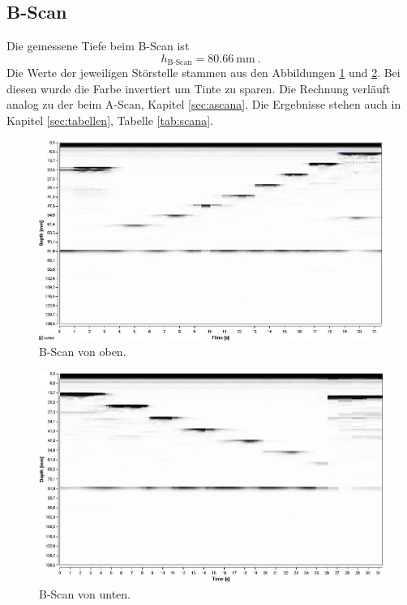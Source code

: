 \subsection{B-Scan}
\label{sec:bscana}
Die gemessene Tiefe beim B-Scan ist
\begin{equation}
    h_\text{B-Scan}= \SI{80.66}{\milli\meter}\:.
\end{equation}
Die Werte der jeweiligen Störstelle stammen aus den Abbildungen \ref{fig:bscano} und \ref{fig:bscanu}.
Bei diesen wurde die Farbe invertiert um Tinte zu sparen.
Die Rechnung verläuft analog zu der beim A-Scan, Kapitel \ref{sec:ascana}.
Die Ergebnisse stehen auch in Kapitel \ref{sec:tabellen}, Tabelle \ref{tab:scana}.

\begin{figure}
    \centering
    \includegraphics[width=\textwidth]{content/bilder/b-scan-oben.jpg}
    \caption{B-Scan von oben.}
    \label{fig:bscano}
\end{figure}

\begin{figure}
    \centering
    \includegraphics[width=\textwidth]{content/bilder/b-scan-unten.jpg}
    \caption{B-Scan von unten.}
    \label{fig:bscanu}
\end{figure}
